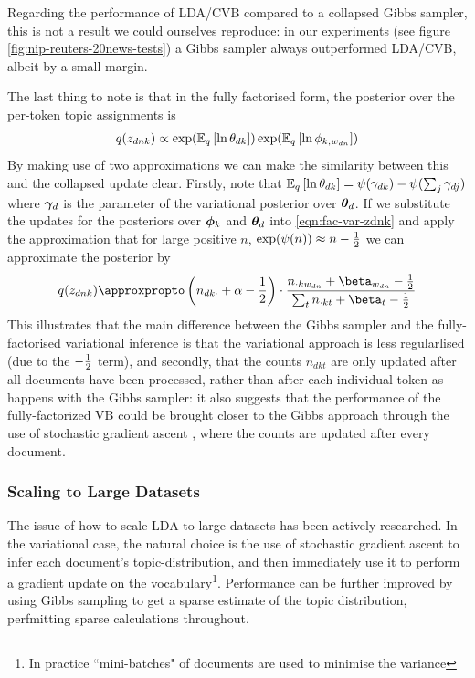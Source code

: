 Regarding the performance of LDA/CVB compared to a collapsed Gibbs sampler, this is not a result we could ourselves reproduce: in our experiments (see figure \ref{fig:nip-reuters-20news-tests}) a Gibbs sampler always outperformed LDA/CVB, albeit by a small margin.

The last thing to note is that in the fully factorised form, the posterior over the per-token topic assignments is
\begin{align}
q(z_{dnk}) \propto \exp(\ex{\ln \theta_{dk}}{q})\exp(\ex{\ln \phi_{k,w_{dn}}}{q})
\label{eqn:fac-var-zdnk}
\end{align}
By making use of two approximations we can make the similarity between this and the collapsed update clear. Firstly, note that $\ex{\ln \theta_{dk}}{q} = \psi(\gamma_{dk}) - \psi(\sum_j \gamma_{dj})$ where $\vv{\gamma}_d$ is the parameter of the variational posterior over $\thd$. If we substitute the updates for the posteriors over $\pk$ and $\thd$ into \eqref{eqn:fac-var-zdnk} and apply the approximation that for large positive $n$, $\exp(\psi(n)) \approx n - \half$ we can approximate the posterior by
\begin{align}
q(z_{dnk}) \approxpropto \left(n_{dk\cdot} + \alpha - \half\right) \cdot \frac{n_{\cdot k w_{dn}} + \beta_{w_{dn}} - \half}{\sum_t n_{\cdot k t} + \beta_t - \half}
\end{align}
This illustrates that the main difference between the Gibbs sampler and the fully-factorised variational inference is that the variational approach is less regularlised (due to the $-\half$ term), and secondly, that the counts $n_{dkt}$ are only updated after all documents have been processed, rather than after each individual token as happens with the Gibbs sampler: it also suggests that the performance of the fully-factorized VB could be brought closer to the Gibbs approach through the use of stochastic gradient ascent\cite{Hoffman2012} , where the counts are updated after every document.



\subsubsection*{Scaling to Large Datasets}
The issue of how to scale LDA to large datasets has been actively researched. In the variational case, the natural choice is the use of stochastic gradient ascent\cite{Bottou2004}\cite{Bottou2008} to infer each document's topic-distribution, and then immediately use it to perform a gradient update on the vocabulary\cite{Hoffman2010}\footnote{In practice ``mini-batches" of documents are used to minimise the variance}. Performance can be further improved by using Gibbs sampling to get a sparse estimate of the topic distribution, perfmitting sparse calculations throughout\cite{Mimno2012a}.

